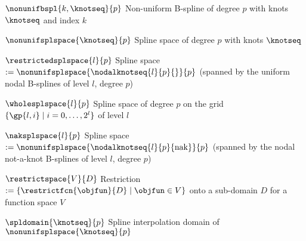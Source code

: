 


%
{$\nonunifbspl{k,\knotseq}{p}$}{
  Non-uniform B-spline of degree $p$ with knots $\knotseq$ and index $k$
}

%
{$\nonunifsplspace{\knotseq}{p}$}{
  Spline space of degree $p$ with knots $\knotseq$
}

%
{$\restrictedsplspace{l}{p}$}{
  Spline space $:= \nonunifsplspace{\nodalknotseq{l}{p}{}}{p}$
  (spanned by the uniform nodal B-splines of level $l$, degree $p$)
}

%
{$\wholesplspace{l}{p}$}{
  Spline space of degree $p$ on the grid
  $\{\gp{l,i} \mid i = 0, \dotsc, 2^l\}$ of level $l$
}

%
{$\naksplspace{l}{p}$}{
  Spline space $:= \nonunifsplspace{\nodalknotseq{l}{p}{\notaknot}}{p}$
  (spanned by the nodal not-a-knot B-splines of level $l$, degree $p$)
}



%
{$\restrictspace{V}{D}$}{
  Restriction $:= \{\restrictfcn{\objfun}{D} \mid \objfun \in V\}$
  onto a sub-domain $D$ for a function space $V$
}

%
{$\spldomain{\knotseq}{p}$}{
  Spline interpolation domain of $\nonunifsplspace{\knotseq}{p}$
}


